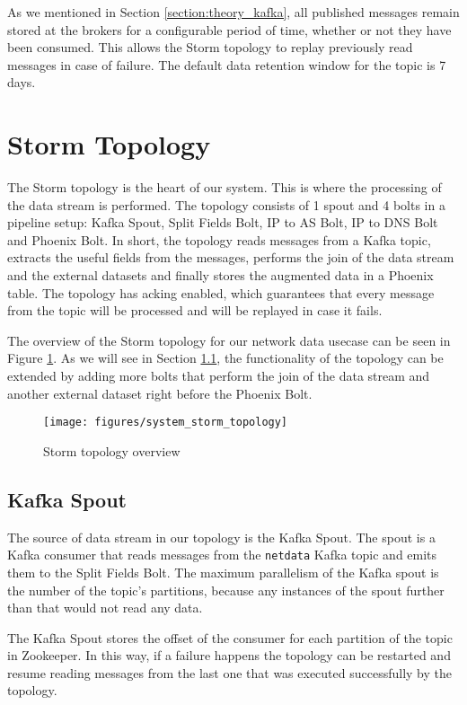 As we mentioned in Section \ref{section:theory_kafka}, all published messages remain stored at the brokers for a configurable period of time, whether or not they have been consumed. This allows the Storm topology to replay previously read messages in case of failure. The default data retention window for the topic is 7 days.


\section{Storm Topology}

The Storm topology is the heart of our system. This is where the processing of the data stream is performed. The topology consists of 1 spout and 4 bolts in a pipeline setup: Kafka Spout, Split Fields Bolt, IP to AS Bolt, IP to DNS Bolt and Phoenix Bolt. In short, the topology reads messages from a Kafka topic, extracts the useful fields from the messages, performs the join of the data stream and the external datasets and finally stores the augmented data in a Phoenix table. The topology has acking enabled, which guarantees that every message from the topic will be processed and will be replayed in case it fails.

The overview of the Storm topology for our network data usecase can be seen in Figure \ref{figure:system_storm_topology}. As we will see in Section \ref{}, the functionality of the topology can be extended by adding more bolts that perform the join of the data stream and another external dataset right before the Phoenix Bolt.

\begin{figure}[H]
\centering
\texttt{[image: figures/system\_storm\_topology]}
\caption{Storm topology overview}
\label{figure:system_storm_topology}
\end{figure}

\subsection{Kafka Spout}

The source of data stream in our topology is the Kafka Spout. The spout is a Kafka consumer that reads messages from the \texttt{netdata} Kafka topic and emits them to the Split Fields Bolt. The maximum parallelism of the Kafka spout is the number of the topic's partitions, because any instances of the spout further than that would not read any data.

The Kafka Spout stores the offset of the consumer for each partition of the topic in Zookeeper. In this way, if a failure happens the topology can be restarted and resume reading messages from the last one that was executed successfully by the topology.

